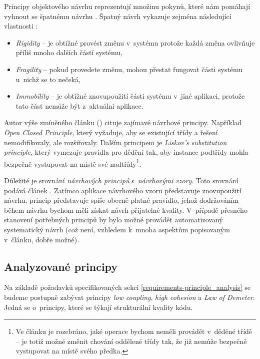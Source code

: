 Principy objektového návrhu reprezentují množinu pokynů, které nám pomáhají vyhnout se špatnému návrhu \cite{oop_design_principles}. Špatný návrh vykazuje zejména následující vlastnosti \cite{oop_design_principles_and_patterns}:

\begin{itemize}
\item \emph{Rigidity} -- je obtížné provést změnu v~systému protože každá změna ovlivňuje příliš mnoho dalších částí systému,
\item \emph{Fragility} -- pokud provedete změnu, mohou přestat fungovat části systému u~nichž se to nečeká,
\item \emph{Immobility} -- je obtížné znovupoužití části systému v~jiné aplikaci, protože tato část nemůže být  z~aktuální aplikace.
\end{itemize}

Autor výše zmíněného článku (\cite{oop_design_principles_and_patterns}) cituje zajímavé návrhové principy. Například \emph{Open Closed Principle}, který vyžaduje, aby se existující třídy a řešení nemodifikovaly, ale rozšiřovaly. Dalším principem je \emph{Liskov's substitution principle}, který vymezuje pravidla pro dědění tak, aby instance podtřídy mohla bezpečně vystupovat na místě své nadtřídy\footnote{Ve článku je rozebráno, jaké operace bychom neměli provádět v~děděné třídě -- je totiž možné změnit chování oddělené třídy tak, že již nemůže bezpečně vystupovat na místě svého předka.}.

Důležité je srovnání \emph{návrhových principů} s~\emph{návrhovými vzory}. Toto srovnání podává článek \cite{612257}. Zatímco aplikace návrhového vzoru představuje znovupoužití  návrhu, princip představuje spíše obecně platné pravidlo, jehož dodržováním během návrhu bychom měli získat návrh přijatelné kvality. V~případě přesného stanovení potřebných principů by bylo možné provádět automatizovaný systematický návrh (což není, vzhledem k~mnoha aspektům popisovaným v~článku, dobře možné).

\subsection{Analyzované principy}
\label{analysis-principles_analyzed}
Na základě požadavků specifikovaných sekci \ref{requirements-principle_analysis} se budeme postupně zabývat principy \emph{low coupling}, \emph{high cohesion} a \emph{Law of Demeter}. Jedná se o~principy, které se týkají strukturální kvality kódu.

